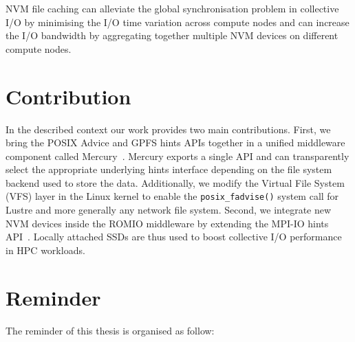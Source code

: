NVM file caching can alleviate the global synchronisation problem in collective I/O by minimising the I/O time variation across compute nodes and can increase the I/O bandwidth by aggregating together multiple NVM devices on different compute nodes.

\section{Contribution} \label{sec: contribution}
In the described context our work provides two main contributions. First, we bring the POSIX Advice and GPFS hints APIs together in a unified middleware component called Mercury~\cite{CongiuGPMSB}. Mercury exports a single API and can transparently select the appropriate underlying hints interface depending on the file system backend used to store the data. Additionally, we modify the Virtual File System (VFS) layer in the Linux kernel to enable the \texttt{posix\_fadvise()} system call for Lustre and more generally any network file system. Second, we integrate new NVM devices inside the ROMIO middleware by extending the MPI-IO hints API~\cite{CongiuNSB}. Locally attached SSDs are thus used to boost collective I/O performance in HPC workloads.

\section{Reminder}
The reminder of this thesis is organised as follow: 
